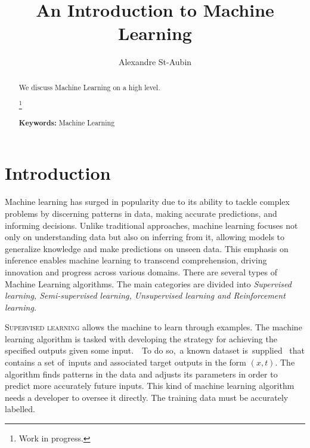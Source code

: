 \documentclass{article}
\title{An Introduction to Machine Learning}
\author{
  Alexandre St-Aubin \\
  }
\begin{document}
 
\maketitle

\begin{abstract} 

\noindent
We discuss Machine Learning on a high level.

  \footnote{Work in progress.}

\vspace{5mm}


\textbf{Keywords:} Machine Learning


\textbf{}

\end{abstract} 


\vfill

\clearpage

\newpage

\tableofcontents

\newpage

\section{Introduction}
 
Machine learning has surged in popularity due to its ability to tackle complex problems by discerning patterns in data, making accurate predictions, and informing decisions. Unlike traditional approaches, machine learning focuses not only on understanding data but also on inferring from it, allowing models to generalize knowledge and make predictions on unseen data. This emphasis on inference enables machine learning to transcend comprehension, driving innovation and progress across various domains. There are several types of Machine Learning algorithms. The main categories are divided into \textit{Supervised learning, Semi-supervised learning, Unsupervised learning and Reinforcement learning.}

\vspace{4mm}
  \noindent \textsc{Supervised learning} allows the machine to learn through examples. The machine learning algorithm is tasked with developing the strategy for achieving the specified outputs given some input.  To do so, a known dataset is supplied  that contains a set of inputs and associated target outputs in the form $(x, t)$. The algorithm finds patterns in the data and adjusts its parameters in order to predict more accurately future inputs. This kind of machine learning algorithm needs a developer to oversee it directly. The training data must be accurately labelled. 
\end{document}
